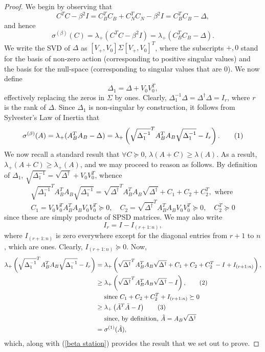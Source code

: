 \documentclass[11pt]{article}
\newcommand{\Geq}{\succeq}
\newcommand\numberthis{\addtocounter{equation}{1}\tag{\theequation}}
\begin{document}
\begin{proof}
We begin by observing that
\[ C^T C - \beta^2 I  = C_B ^T C_B + C_N ^T C_N - \beta^2 I = C_B ^T C_B  - \Delta, \]
and hence
\[ \sigma^{(\beta)} (C) = \lambda_+ \left( C^T C - \beta^2 I \right) = \lambda_+ \left( C_B ^T C_B  - \Delta \right). \]
We write the SVD of $\Delta$ as $[V_+, V_0] \Sigma [V_+, V_0]^T$, where the subscripts $+, 0$ stand for the basis of non-zero action (corresponding to positive singular values) and the basis for the null-space (corresponding to singular values that are 0). We now define 
\[ \Delta_1 = \Delta + V_0 V_0 ^T, \]
effectively replacing the zeros in $\Sigma$ by ones. Clearly, $\Delta_1 ^{-1} \Delta = \Delta^{\dagger} \Delta = I_r$, where $r$ is the rank of $\Delta$. Since $\Delta_1$ is non-singular by construction, it follows from Sylvester's Law of Inertia that
\[ \sigma^{(\beta)} (A) = \lambda_+ (A_B ^T A_B  - \Delta) = \lambda_+ \left( \sqrt{\Delta_1 ^{-1}} ^T A_B ^T A_B \sqrt{\Delta_1 ^{-1}} - I_r  \right) . \numberthis \label{beta station} \]
We now recall a standard result that $\forall C \Geq 0$, $\lambda(A + C) \geq \lambda(A)$. As a result, $\lambda_+ (A+C) \geq \lambda_+ (A)$, and we may proceed to reason as follows. By definition of $\Delta_1$, $\sqrt{\Delta_1^{-1}} = \sqrt{\Delta^{\dagger}} + V_0 V_0 ^T$, whence 
\[ \sqrt{ \Delta_1 ^{-1} } ^T A_B ^T A_B \sqrt{ \Delta_1 ^{-1}}  = \sqrt{\Delta^{\dagger}}^T A_B ^T A_B \sqrt{\Delta^{\dagger}} + C_1 + C_2 + C_2 ^T, \text{ where } \]
\[ C_1 = V_0 V_0 ^T A_B ^T A_B V_0 V_0 ^T \Geq 0, \quad  C_2 = \sqrt{\Delta^{\dagger}}^T A_B ^T A_B V_0 V_0 ^T \Geq 0, \quad  C_2 ^T \Geq 0 \] 
since these are simply products of SPSD matrices. We may also write 
\[ I_r = I - I_{(r+1 : n)}, \]
where $I_{(r+1 : n)}$ is zero everywhere except for the diagonal entries from $r+1$ to $n$, which are ones. Clearly, $I_{(r+1: n)} \Geq 0$. Now, 
\begin{align*}
\lambda_+ \left( \sqrt{ \Delta_1 ^{-1} } ^T A_B ^T A_B \sqrt{ \Delta_1 ^{-1} } - I_r \right)  &= \lambda_+ \left( \sqrt{\Delta^{\dagger}}^T A_B ^T A_B \sqrt{\Delta^{\dagger}} + C_1 + C_2 + C_2 ^T - I + I_{(r+1 : n)} \right),  \\
& \geq \lambda_+ \left( \sqrt{\Delta^{\dagger}}^T A_B ^T A_B \sqrt{\Delta^{\dagger}}  - I \right),  \numberthis \label{p2inv}\\ 
& \quad \text{ since } C_1 + C_2 + C_2 ^T + I_{(r+1 : n)} \Geq 0 \\
& \geq \lambda_+ \left( \tilde{A} ^T \tilde{A} - I \right) \numberthis \label{p2inv2} \\
& \quad \text{ since, by definition, } \tilde{A} = A_B \sqrt{\Delta ^{\dagger}} \\
& = \sigma^{(1)}(\tilde A), 
\end{align*}
which, along with (\ref{beta station}) provides the result that we set out to prove.
\end{proof}
\end{document}
